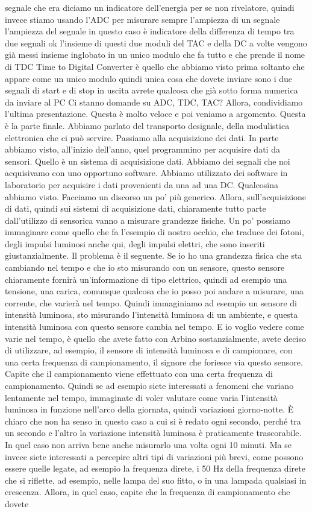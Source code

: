 {segnale che era diciamo un indicatore dell'energia per se non rivelatore, quindi invece stiamo usando l'ADC per misurare sempre l'ampiezza di un segnale l'ampiezza del segnale in questo caso è indicatore della differenza di tempo tra due segnali ok l'insieme di questi due moduli del TAC e della DC a volte vengono già messi insieme inglobato in un unico modulo che fa tutto e che prende il nome di TDC Time to Digital Converter è quello che abbiamo visto prima soltanto che appare come un unico modulo quindi unica cosa che dovete inviare sono i due segnali di start e di stop in uscita avrete qualcosa che già sotto forma numerica da inviare al PC Ci stanno domande su ADC, TDC, TAC? Allora, condividiamo l'ultima presentazione. Questa è molto veloce e poi veniamo a argomento. Questa è la parte finale. Abbiamo parlato del transporto designale, della modulistica elettronica che ci può servire. Passiamo alla acquisizione dei dati. In parte abbiamo visto, all'inizio dell'anno, quel programmino per acquisire dati da sensori. Quello è un sistema di acquisizione dati. Abbiamo dei segnali che noi acquisivamo con uno opportuno software. Abbiamo utilizzato dei software in laboratorio per acquisire i dati provenienti da una ad una DC. Qualcosina abbiamo visto. Facciamo un discorso un po' più generico. Allora, sull'acquisizione di dati, quindi sui sistemi di acquisizione dati, chiaramente tutto parte dall'utilizzo di sensorica vanno a misurare grandezze fisiche. Un po' possiamo immaginare come quello che fa l'esempio di nostro occhio, che traduce dei fotoni, degli impulsi luminosi anche qui, degli impulsi elettri, che sono inseriti giustanzialmente. Il problema è il seguente. Se io ho una grandezza fisica che sta cambiando nel tempo e che io sto misurando con un sensore, questo sensore chiaramente fornirà un'informazione di tipo elettrico, quindi ad esempio una tensione, una carica, comunque qualcosa che io posso poi andare a misurare, una corrente, che varierà nel tempo. Quindi immaginiamo ad esempio un sensore di intensità luminosa, sto misurando l'intensità luminosa di un ambiente, e questa intensità luminosa con questo sensore cambia nel tempo. E io voglio vedere come varie nel tempo, è quello che avete fatto con Arbino sostanzialmente, avete deciso di utilizzare, ad esempio, il sensore di intensità luminosa e di campionare, con una certa frequenza di campionamento, il signore che foriesce via questo sensore. Capite che il campionamento viene effettuato con una certa frequenza di campionamento. Quindi se ad esempio siete interessati a fenomeni che variano lentamente nel tempo, immaginate di voler valutare come varia l'intensità luminosa in funzione nell'arco della giornata, quindi variazioni giorno-notte. È chiaro che non ha senso in questo caso a cui si è redato ogni secondo, perché tra un secondo e l'altro la variazione intensità luminosa è praticamente trascorabile. In quel caso non arriva bene anche misurarlo una volta ogni 10 minuti. Ma se invece siete interessati a percepire altri tipi di variazioni più brevi, come possono essere quelle legate, ad esempio la frequenza direte, i 50 Hz della frequenza direte che si riflette, ad esempio, nelle lampa del suo fitto, o in una lampada qualsiasi in crescenza. Allora, in quel caso, capite che la frequenza di campionamento che dovete }
